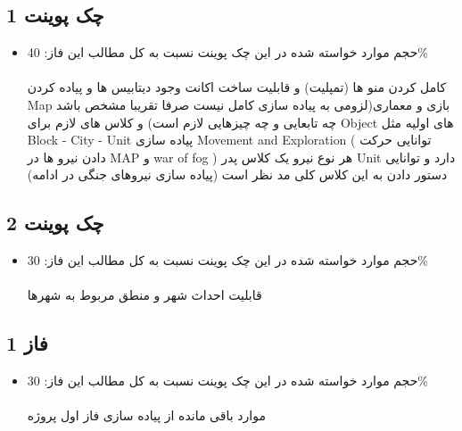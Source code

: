 \documentclass[]{article}
\begin{document}
\newpage
\subsection*{\titr چک پوینت 1}
\begin{itemize}
    \item حجم موارد خواسته شده در این چک پوینت نسبت به کل مطالب این فاز: 40\%
    \\
    \\
کامل کردن منو ها (تمپلیت) و قابلیت ساخت اکانت وجود دیتابیس ها  و پیاده کردن Map بازی و معماری(لزومی به پیاده سازی کامل نیست صرفا تقریبا مشخص باشد چه تابعایی و چه چیزهایی لازم است) و کلاس های لازم برای Object های اولیه مثل Block - City - Unit پیاده سازی Movement and Exploration ( توانایی حرکت دادن نیرو ها در MAP و war of fog ) هر نوع نیرو یک کلاس پدر Unit دارد و توانایی دستور دادن به این کلاس کلی مد نظر است (پیاده سازی نیروهای جنگی در ادامه)
\end{itemize}

\subsection*{\titr چک پوینت 2}
  \begin{itemize}  
    \item حجم موارد خواسته شده در این چک پوینت نسبت به کل مطالب این فاز: 30\%
    \\
    \\
    قابلیت احداث شهر و منطق مربوط به شهرها
\end{itemize}
\subsection*{\titr فاز 1}
 \begin{itemize}   
    \item حجم موارد خواسته شده در این چک پوینت نسبت به کل مطالب این فاز: 30\%
    \\
    \\
    موارد باقی مانده از پیاده سازی فاز اول پروژه
\end{itemize}
\end{document}
